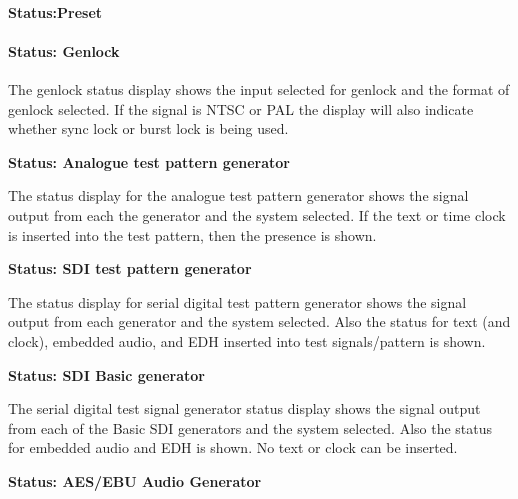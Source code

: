 \paragraph{Status:Preset}

\paragraph{Status: Genlock}

The genlock status display shows the input selected for genlock and the format of genlock selected. If the signal is NTSC or PAL the display will also indicate whether sync lock or burst lock is being used.

\textbf{Status: Analogue test pattern generator}

The status display for the analogue test pattern generator shows the signal output from each the generator and the system selected. If the text or time clock is inserted into the test pattern, then the presence is shown.

\textbf{Status: SDI test pattern generator}

The status display for serial digital test pattern generator shows the signal output from each generator and the system selected. Also the status for text (and clock), embedded audio, and EDH inserted into test signals/pattern is shown.

\textbf{Status: SDI Basic generator}

The serial digital test signal generator status display shows the signal output from each of the Basic SDI generators and the system selected. Also the status for embedded audio and EDH is shown. No text or clock can be inserted.

\textbf{Status: AES/EBU Audio Generator}

